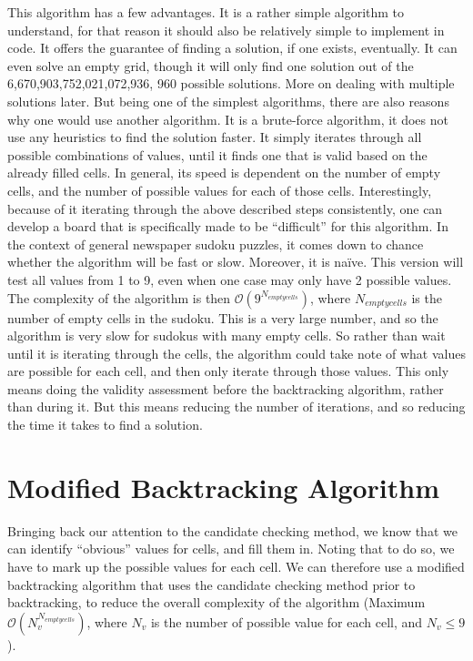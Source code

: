 \documentclass[12pt]{report} %
\begin{document}
\vspace*{1\baselineskip}
This algorithm has a few advantages. It is a rather simple algorithm to understand, for that reason it should also be relatively simple to implement in code. It offers the guarantee of finding a solution, if one exists, eventually. It can even solve an empty grid, though it will only find one solution out of the 6,670,903,752,021,072,936, 960 possible solutions\cite{cornell_sudoku3}. More on dealing with multiple solutions later.
But being one of the simplest algorithms, there are also reasons why one would use another algorithm. It is a brute-force algorithm, it does not use any heuristics to find the solution faster. It simply iterates through all possible combinations of values, until it finds one that is valid based on the already filled cells. In general, its speed is dependent on the number of empty cells, and the number of possible values for each of those cells. Interestingly, because of it iterating through the above described steps consistently, one can develop a board that is specifically made to be ``difficult'' for this algorithm. In the context of general newspaper sudoku puzzles, it comes down to chance whether the algorithm will be fast or slow. Moreover, it is naïve. This version will test all values from 1 to 9, even when one case may only have 2 possible values. The complexity of the algorithm is then $\mathcal{O}(9^{N_{empty cells}})$, where $N_{empty cells}$ is the number of empty cells in the sudoku. This is a very large number, and so the algorithm is very slow for sudokus with many empty cells.
So rather than wait until it is iterating through the cells, the algorithm could take note of what values are possible for each cell, and then only iterate through those values. This only means doing the validity assessment before the backtracking algorithm, rather than during it. But this means reducing the number of iterations, and so reducing the time it takes to find a solution.

\section{Modified Backtracking Algorithm}

Bringing back our attention to the candidate checking method, we know that we can identify ``obvious'' values for cells, and fill them in. Noting that to do so, we have to mark up the possible values for each cell. We can therefore use a modified backtracking algorithm that uses the candidate checking method prior to backtracking, to reduce the overall complexity of the algorithm (Maximum $\mathcal{O}(N_{v}^{N_{empty cells}})$, where $N_{v}$ is the number of possible value for each cell, and $N_{v}\leq 9$).
\end{document}
